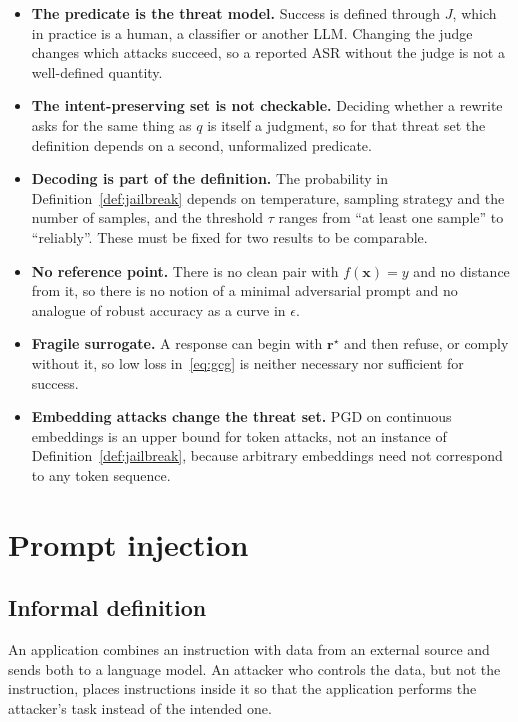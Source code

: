 \documentclass[10pt,a4paper]{extarticle}
\theoremstyle{definition}
\newcommand{\x}{\mathbf{x}}
\begin{document}
\begin{itemize}[leftmargin=1.5em]
  \item \textbf{The predicate is the threat model.} Success is defined through $J$, which in practice is a human, a classifier or another LLM. Changing the judge changes which attacks succeed, so a reported ASR without the judge is not a well-defined quantity.
  \item \textbf{The intent-preserving set is not checkable.} Deciding whether a rewrite asks for the same thing as $q$ is itself a judgment, so for that threat set the definition depends on a second, unformalized predicate.
  \item \textbf{Decoding is part of the definition.} The probability in Definition~\ref{def:jailbreak} depends on temperature, sampling strategy and the number of samples, and the threshold $\tau$ ranges from \enquote{at least one sample} to \enquote{reliably}. These must be fixed for two results to be comparable.
  \item \textbf{No reference point.} There is no clean pair with $f(\x)=y$ and no distance from it, so there is no notion of a minimal adversarial prompt and no analogue of robust accuracy as a curve in $\epsilon$.
  \item \textbf{Fragile surrogate.} A response can begin with $\mathbf{r}^\star$ and then refuse, or comply without it, so low loss in~\eqref{eq:gcg} is neither necessary nor sufficient for success.
  \item \textbf{Embedding attacks change the threat set.} PGD on continuous embeddings is an upper bound for token attacks, not an instance of Definition~\ref{def:jailbreak}, because arbitrary embeddings need not correspond to any token sequence.
\end{itemize}

\section{Prompt injection}\label{sec:injection}

\subsection{Informal definition}

An application combines an instruction with data from an external source and sends both to a language model. An attacker who controls the data, but not the instruction, places instructions inside it so that the application performs the attacker's task instead of the intended one.
\end{document}
